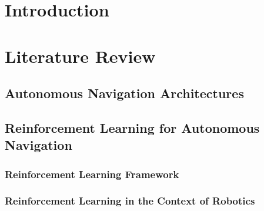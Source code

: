 \documentclass[a4paper,oneside,12pt]{report}
\begin{document}
\tableofcontents
{}
\clearpage


\clearpage



\setlength{\parindent}{5mm}
\normalsize
{}
\chapter{Introduction}
\label{ch:introduction}




\chapter{Literature Review}
\label{ch:litearure review}

\section{Autonomous Navigation Architectures}


\section{Reinforcement Learning for Autonomous Navigation}

\subsection{Reinforcement Learning Framework}


\subsection{Reinforcement Learning in the Context of Robotics}
\end{document}
